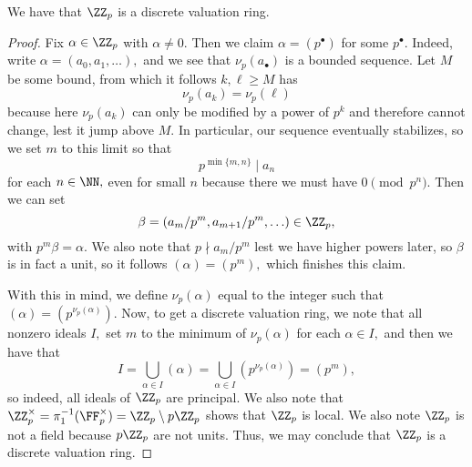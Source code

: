 \begin{proposition}
	We have that $\ZZ_p$ is a discrete valuation ring.
\end{proposition}
\begin{proof}
	Fix $\alpha\in\ZZ_p$ with $\alpha\ne0.$ Then we claim $\alpha=\left(p^\bullet\right)$ for some $p^\bullet.$ Indeed, write $\alpha=(a_0,a_1,\ldots),$ and we see that $\nu_p(a_\bullet)$ is a bounded sequence. Let $M$ be some bound, from which it follows $k,\ell\ge M$ has
	\[\nu_p(a_k)=\nu_p(\ell)\]
	because here $\nu_p(a_k)$ can only be modified by a power of $p^k$ and therefore cannot change, lest it jump above $M.$ In particular, our sequence eventually stabilizes, so we set $m$ to this limit so that
	\[p^{\min\{m,n\}}\mid a_n\]
	for each $n\in\NN,$ even for small $n$ because there we must have $0\pmod{p^n}.$ Then we can set
	\[\beta=(a_m/p^m,a_{m+1}/p^m,\ldots)\in\ZZ_p,\]
	with $p^m\beta=\alpha.$ We also note that $p\nmid a_m/p^m$ lest we have higher powers later, so $\beta$ is in fact a unit, so it follows $(\alpha)=\left(p^m\right),$ which finishes this claim.

	With this in mind, we define $\nu_p(\alpha)$ equal to the integer such that $(\alpha)=\left(p^{\nu_p(\alpha)}\right).$ Now, to get a discrete valuation ring, we note that all nonzero ideals $I,$ set $m$ to the minimum of $\nu_p(\alpha)$ for each $\alpha\in I,$ and then we have that
	\[I=\bigcup_{\alpha\in I}(\alpha)=\bigcup_{\alpha\in I}\left(p^{\nu_p(\alpha)}\right)=\left(p^m\right),\]
	so indeed, all ideals of $\ZZ_p$ are principal. We also note that $\ZZ_p^\times=\pi_1^{-1}(\FF_p^\times)=\ZZ_p\setminus p\ZZ_p$ shows that $\ZZ_p$ is local. We also note $\ZZ_p$ is not a field because $p\ZZ_p$ are not units. Thus, we may conclude that $\ZZ_p$ is a discrete valuation ring.
\end{proof}
